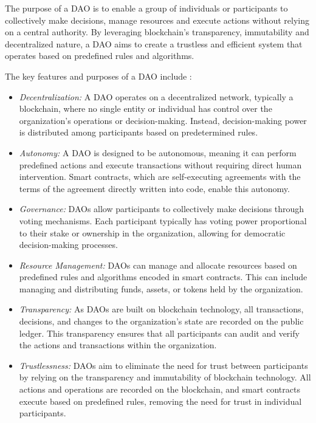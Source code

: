 The purpose of a DAO is to enable a group of individuals or participants to collectively make decisions, manage resources and execute actions without relying on a central authority. By leveraging blockchain's transparency, immutability and decentralized nature, a DAO aims to create a trustless and efficient system that operates based on predefined rules and algorithms.\newline

The key features and purposes of a DAO include \cite{dao, dao2, dao3}:

\begin{itemize}
    \item \textit{Decentralization:} A DAO operates on a decentralized network, typically a blockchain, where no single entity or individual has control over the organization's operations or decision-making. Instead, decision-making power is distributed among participants based on predetermined rules.
    \item \textit{Autonomy:} A DAO is designed to be autonomous, meaning it can perform predefined actions and execute transactions without requiring direct human intervention. Smart contracts, which are self-executing agreements with the terms of the agreement directly written into code, enable this autonomy.
    \item \textit{Governance:} DAOs allow participants to collectively make decisions through voting mechanisms. Each participant typically has voting power proportional to their stake or ownership in the organization, allowing for democratic decision-making processes.
    \item \textit{Resource Management:} DAOs can manage and allocate resources based on predefined rules and algorithms encoded in smart contracts. This can include managing and distributing funds, assets, or tokens held by the organization.
    \item \textit{Transparency:} As DAOs are built on blockchain technology, all transactions, decisions, and changes to the organization's state are recorded on the public ledger. This transparency ensures that all participants can audit and verify the actions and transactions within the organization.
    \item \textit{Trustlessness:} DAOs aim to eliminate the need for trust between participants by relying on the transparency and immutability of blockchain technology. All actions and operations are recorded on the blockchain, and smart contracts execute based on predefined rules, removing the need for trust in individual participants.
\end{itemize}

